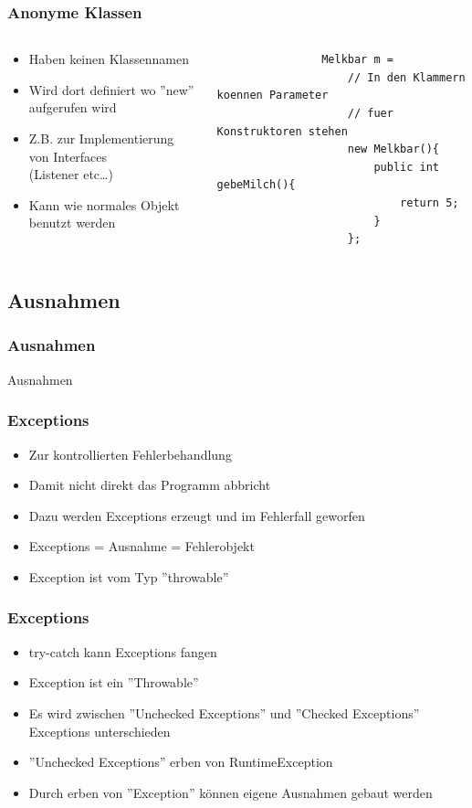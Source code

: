 \begin{frame}[fragile]
	\frametitle{Anonyme Klassen}
	\begin{columns}
		\begin{column}{0.5\textwidth}
			\begin{itemize}
				  \item Haben keinen Klassennamen
				  \item Wird dort definiert wo 
				  ''new'' aufgerufen wird
				  \item Z.B. zur Implementierung von Interfaces\\
				  (Listener etc\ldots)
				  \item Kann wie normales Objekt benutzt werden
			\end{itemize}
		\end{column}
		\begin{column}{0.5\textwidth}
			\begin{lstlisting}
				Melkbar m = 
					// In den Klammern koennen Parameter
					// fuer Konstruktoren stehen
					new Melkbar(){
						public int gebeMilch(){
							return 5;
						}
					};
			\end{lstlisting}
		\end{column} 
	\end{columns}
\end{frame}

\subsection{Ausnahmen}
\begin{frame}[fragile]
	\frametitle{Ausnahmen}
	\huge Ausnahmen
\end{frame}

\begin{frame}[fragile]
	\frametitle{Exceptions}
	\begin{itemize}
	  \item Zur kontrollierten Fehlerbehandlung
	  \item Damit nicht direkt das Programm abbricht
	  \item Dazu werden Exceptions erzeugt und im Fehlerfall
	  geworfen
	  \item Exceptions = Ausnahme = Fehlerobjekt
	  \item Exception ist vom Typ ''throwable''
	\end{itemize}
\end{frame}

\begin{frame}[fragile]
	\frametitle{Exceptions}
	\begin{itemize}
	  \item try-catch kann Exceptions fangen
	  \item Exception ist ein ''Throwable''
	  \item Es wird zwischen ''Unchecked Exceptions''
	  und ''Checked Exceptions'' Exceptions unterschieden
	  \item ''Unchecked Exceptions'' erben von RuntimeException
	  \item Durch erben von ''Exception'' k\"onnen
	  eigene Ausnahmen gebaut werden
	\end{itemize}
\end{frame}  

